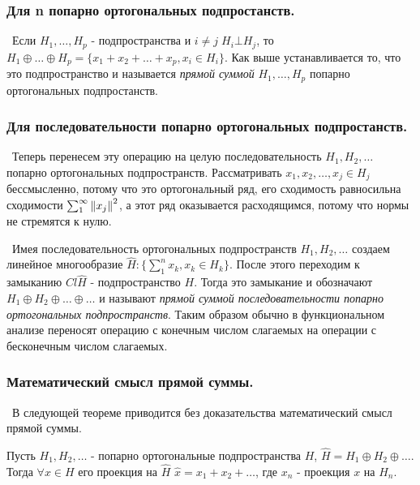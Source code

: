 \subsubsection*{Для n попарно ортогональных подпростанств.}

\noindent\textasteriskcentered~Если $H_1, \dots, H_p$ - подпространства и $i \neq j \; H_i \bot H_j$, то $H_1 \oplus \dots \oplus H_p = \{ x_1 + x_2 + \dots + x_p , 
x_i \in H_i \}$. Как выше устанавливается то, что это подпространство и называется \textit{прямой суммой} $H_1, \dots, H_p$ попарно ортогональных подпростанств.


\subsubsection*{Для последовательности попарно ортогональных подпростанств.}

\noindent\textbullet~Теперь перенесем эту операцию на целую последовательность $H_1, H_2, \dots$ попарно ортогональных подпространств. Рассматривать $x_1, x_2, \dots, x_j
\in H_j$ бессмысленно, потому что это ортогональный ряд, его сходимость равносильна сходимости $\sum_1^\infty \left\lVert x_j\right\rVert^2$, а этот ряд оказывается расходящимся, потому 
что нормы не стремятся к нулю.

\smallskip 
\noindent\textasteriskcentered~Имея последовательность ортогональных подпространств $H_1, H_2, \dots$ создаем линейное многообразие $\hat{H} : 
\{ \sum_1^n x_k, x_k \in H_k\}$. После этого переходим к замыканию $Cl \hat{H}$ - подпространство $H$. Тогда это замыкание и обозначают $H_1 \oplus H_2 \oplus \dots \oplus \dots$ и называют \textit{ прямой суммой последовательности попарно ортогональных подпространств}. Таким образом обычно в функциональном анализе переносят операцию
с конечным числом слагаемых на операции с бесконечным числом слагаемых.


\subsubsection*{Математический смысл прямой суммы. }

\noindent\textbullet~В следующей теореме приводится без доказательства математический смысл прямой суммы.

\begin{theorem*}
Пусть $H_1, H_2, \dots$ - попарно ортогональные подпространства $H$, $\hat{H} = H_1 \oplus H_2 \oplus \dots$. Тогда $\forall x \in H$ его проекция на $\hat{H}$ $\hat{x}
= x_1 + x_2 + \dots$, где $x_n$ - проекция $x$ на $H_n$.
\end{theorem*}